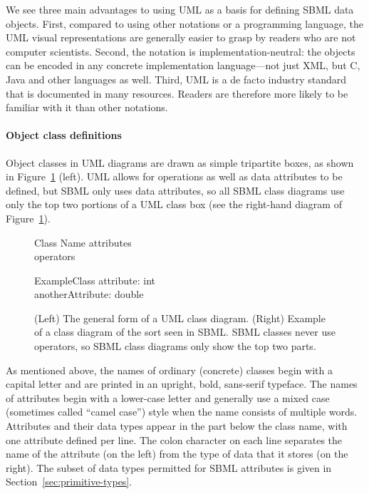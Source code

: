 We see three main advantages to using UML as a basis for defining
SBML data objects.  First, compared to using other notations or
a programming language, the UML visual representations are
generally easier to grasp by readers who are not computer
scientists.  Second, the notation is implementation-neutral: the
objects can be encoded in any concrete implementation
language---not just XML, but C, Java and other languages as well.
Third, UML is a de facto industry standard that is documented in
many resources.  Readers are therefore more likely to be familiar
with it than other notations.


\paragraph{Object class definitions}

Object classes in UML diagrams are drawn as simple tripartite
boxes, as shown in Figure~\ref{fig:simple-class-eg} (left).  UML
allows for operations as well as data attributes to be defined,
but SBML only uses data attributes, so all SBML class diagrams use
only the top two portions of a UML class box (see the right-hand
diagram of Figure~\ref{fig:simple-class-eg}).

\begin{figure}[htb]
  \centering
  \small
  \begin{classbox}{Class Name}
    attributes\\
    \hline
    operators\\
  \end{classbox}
  \quad  \quad  \quad  \quad
  \begin{classbox}{ExampleClass}
    attribute: int \\
    anotherAttribute: double\\
  \end{classbox}
  \caption{(Left) The general form of a UML class
      diagram.  (Right) Example of a class diagram of the sort
      seen in SBML.  SBML classes never use operators, so SBML
      class diagrams only show the top two parts.}
  \label{fig:simple-class-eg}
\end{figure}

As mentioned above, the names of ordinary (concrete) classes begin
with a capital letter and are printed in an upright,
bold, sans-serif typeface.  The names of attributes
begin with a lower-case letter and generally use a mixed case
(sometimes called ``camel case'') style when the name consists of
multiple words.  Attributes and their data types appear in the
part below the class name, with one attribute defined per line.
The colon character on each line separates the name of the
attribute (on the left) from the type of data that it stores (on
the right).  The subset of data types permitted for SBML
attributes is given in Section~\ref{sec:primitive-types}.

